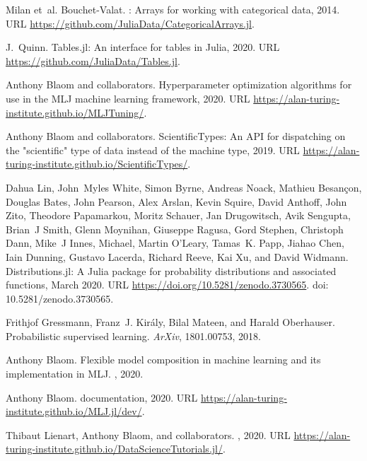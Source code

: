 \documentclass{article}
\begin{document}
\begin{thebibliography}{18}
Milan et~al. Bouchet-Valat.
: {A}rrays for working with categorical data,
  2014.
\newblock URL \url{https://github.com/JuliaData/CategoricalArrays.jl}.

J.~Quinn.
\newblock Tables.jl: {A}n interface for tables in {J}ulia, 2020.
\newblock URL \url{https://github.com/JuliaData/Tables.jl}.

Anthony Blaom and collaborators.
\newblock Hyperparameter optimization algorithms for use in the {MLJ} machine
  learning framework, 2020.
\newblock URL \url{https://alan-turing-institute.github.io/MLJTuning/}.

Anthony Blaom and collaborators.
\newblock ScientificTypes: An API for dispatching on the "scientific" type of data instead of the machine type, 2019.
\newblock URL \url{https://alan-turing-institute.github.io/ScientificTypes/}.

Dahua Lin, John~Myles White, Simon Byrne, Andreas Noack, Mathieu Besançon,
  Douglas Bates, John Pearson, Alex Arslan, Kevin Squire, David Anthoff, John
  Zito, Theodore Papamarkou, Moritz Schauer, Jan Drugowitsch, Avik Sengupta,
  Brian~J Smith, Glenn Moynihan, Giuseppe Ragusa, Gord Stephen, Christoph Dann,
  Mike~J Innes, Michael, Martin O'Leary, Tamas~K. Papp, Jiahao Chen, Iain
  Dunning, Gustavo Lacerda, Richard Reeve, Kai Xu, and David Widmann.
\newblock Distributions.jl: {A} {J}ulia package for probability distributions
  and associated functions, March 2020.
\newblock URL \url{https://doi.org/10.5281/zenodo.3730565}.
\newblock doi: {10.5281/zenodo.3730565}.

Frithjof Gressmann, Franz~J. Király, Bilal Mateen, and Harald Oberhauser.
\newblock Probabilistic supervised learning.
\newblock \emph{ArXiv}, 1801.00753, 2018.

Anthony Blaom.
\newblock Flexible model composition in machine learning and its implementation
  in {MLJ}.
\newblock \emph{}, 2020{}.

Anthony Blaom.
 documentation, 2020{}.
\newblock URL \url{https://alan-turing-institute.github.io/MLJ.jl/dev/}.

Thibaut Lienart, Anthony Blaom, and collaborators.
, 2020.
\newblock URL
  \url{https://alan-turing-institute.github.io/DataScienceTutorials.jl/}.

\end{thebibliography}
\end{document}
